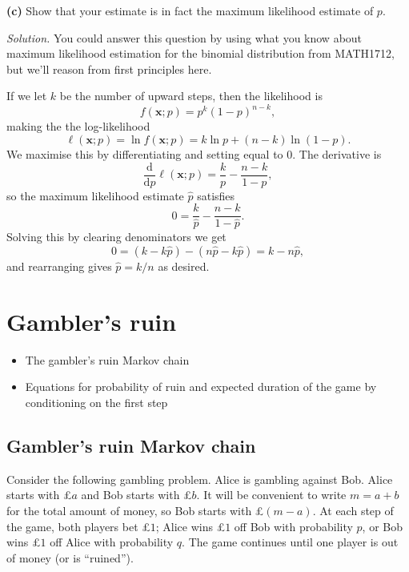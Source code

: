 \documentclass[
  a4paper,
]{article}
\providecommand{\tightlist}{%
  \setlength{\itemsep}{0pt}\setlength{\parskip}{0pt}}
\theoremstyle{definition}
\theoremstyle{definition}
\theoremstyle{definition}
\theoremstyle{remark}
\begin{document}
\textbf{(c)} Show that your estimate is in fact the maximum likelihood estimate of \(p\).

\emph{Solution.} You could answer this question by using what you know about maximum likelihood estimation for the binomial distribution from MATH1712, but we'll reason from first principles here.

If we let \(k\) be the number of upward steps, then the likelihood is
\[ f(\mathbf x; p) = p^{k}(1-p)^{n-k} , \]
making the the log-likelihood
\[ \ell(\mathbf x; p) = \ln f(\mathbf x; p) = k \ln p + (n-k)\ln(1-p) .\]
We maximise this by differentiating and setting equal to \(0\). The derivative is
\[ \frac{\text{d}}{\text{d}p} \ell(\mathbf x; p) = \frac kp - \frac{n-k}{1-p} ,\]
so the maximum likelihood estimate \(\hat p\) satisfies
\[ 0 = \frac k{\hat p} - \frac{n-k}{1-\hat p} . \]
Solving this by clearing denominators we get
\[ 0 = (k - k\hat p) - (n\hat p - k\hat p) = k - n \hat p , \]
and rearranging gives \(\hat p = k/n\) as desired.

\hypertarget{S03-gamblers-ruin}{%
\section{Gambler's ruin}\label{S03-gamblers-ruin}}

\begin{itemize}
\tightlist
\item
  The gambler's ruin Markov chain
\item
  Equations for probability of ruin and expected duration of the game by conditioning on the first step
\end{itemize}

\hypertarget{ruin-chain}{%
\subsection{Gambler's ruin Markov chain}\label{ruin-chain}}

Consider the following gambling problem. Alice is gambling against Bob. Alice starts with £\(a\) and Bob starts with £\(b\). It will be convenient to write \(m = a + b\) for the total amount of money, so Bob starts with £\((m-a)\). At each step of the game, both players bet £\(1\); Alice wins £\(1\) off Bob with probability \(p\), or Bob wins £\(1\) off Alice with probability \(q\). The game continues until one player is out of money (or is ``ruined'').
\end{document}
